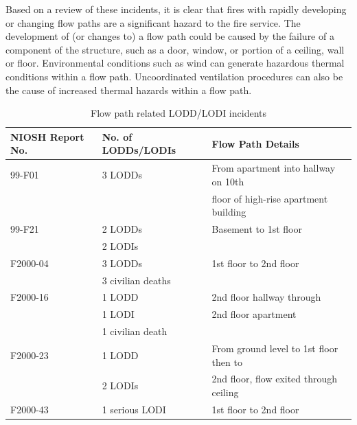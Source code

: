 \documentclass[12pt,oneside]{book}
\begin{document}
Based on a review of these incidents, it is clear that fires with rapidly developing or changing flow paths are a significant hazard to the fire service. The development of (or changes to) a flow path could be caused by the failure of a component of the structure, such as a door, window, or portion of a ceiling, wall or floor. Environmental conditions such as wind can generate hazardous thermal conditions within a flow path. Uncoordinated ventilation procedures can also be the cause of increased thermal hazards within a flow path.

\begin{table}[!ht]
\caption[Flow path related LODD/LODI incidents]
{Flow path related LODD/LODI incidents}
\begin{tabular}{lll}
\toprule
NIOSH Report No. & No. of LODDs/LODIs & Flow Path Details                                              \\
\midrule
99-F01   \cite{NIOSH:Pettit}        &  3 LODDs            &  From apartment into hallway on 10th       \\
                                    &                     &  floor of high-rise apartment building     \\
99-F21   \cite{NIOSH:Washenitz}     &  2 LODDs            &  Basement to 1st floor                     \\
                                    &  2 LODIs            &                                            \\
F2000-04 \cite{NIOSH:Mezzanotte}    &  3 LODDs            &  1st floor to 2nd floor                    \\
                                    &  3 civilian deaths  &                                            \\
F2000-16 \cite{NIOSH:McFall}        &  1 LODD             &  2nd floor hallway through                 \\
                                    &  1 LODI             &  2nd floor apartment                       \\
                                    &  1 civilian death   &                                            \\
F2000-23 \cite{NIOSH:McFall2}       &  1 LODD             &  From ground level to 1st floor then to    \\
                                    &  2 LODIs            &  2nd floor, flow exited through ceiling    \\
F2000-43 \cite{NIOSH:McFall3}       &  1 serious LODI     &  1st floor to 2nd floor                    \\

\end{tabular}
\end{table}
\end{document}
